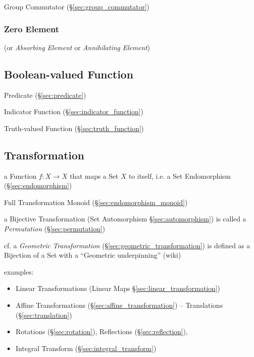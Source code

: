 Group Commutator (\S\ref{sec:group_commutator})



\subsubsection{Zero Element}\label{sec:zero_element}

(or \emph{Absorbing Element} or \emph{Annihilating Element})



\subsection{Boolean-valued Function}\label{sec:boolean_function}

Predicate (\S\ref{sec:predicate})

Indicator Function (\S\ref{sec:indicator_function})

Truth-valued Function (\S\ref{sec:truth_function})



\subsection{Transformation}\label{sec:transformation}

a Function $f : X \to X$ that maps a Set $X$ to itself, i.e. a Set Endomorphism
(\S\ref{sec:endomorphism})

\fist Full Transformation Monoid (\S\ref{sec:endomorphism_monoid})

a Bijective Transformation (Set Automorphism \S\ref{sec:automorphism}) is called
a \emph{Permutation} (\S\ref{sec:permutation})

cf. a \emph{Geometric Transformation} (\S\ref{sec:geometric_transformation}) is
defined as a Bijection of a Set with a ``Geometric underpinning'' (wiki)

examples:

\begin{itemize}
  \item Linear Transformations (Linear Maps \S\ref{sec:linear_transformation})
  \item Affine Transformations (\S\ref{sec:affine_transformation}) --
    Translations (\S\ref{sec:translation})
  \item Rotations (\S\ref{sec:rotation}), Reflections (\S\ref{sec:reflection}),
  \item Integral Transform (\S\ref{sec:integral_transform})
\end{itemize}



